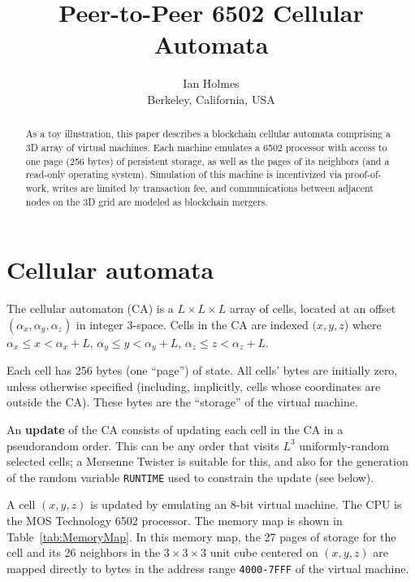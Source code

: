 \documentclass{article}
\newcommand\hex[1]{{\tt #1}}
\newcommand\hexrange[2]{\hex{#1}{\tt -}\hex{#2}}
\begin{document}
\title{Peer-to-Peer 6502 Cellular Automata}
\author{Ian Holmes \\ Berkeley, California, USA}

\maketitle


\begin{abstract}
  As a toy illustration,
  this paper describes a blockchain cellular automata
  comprising a 3D array of virtual machines.
  Each machine emulates a 6502 processor with access to one page (256 bytes) of persistent storage,
  as well as the pages of its neighbors (and a read-only operating system).
  Simulation of this machine is incentivized via proof-of-work,
  writes are limited by transaction fee,
  and communications between adjacent nodes on the 3D grid are modeled as blockchain mergers.
\end{abstract}

\section{Cellular automata}

The cellular automaton (CA) is a $L \times L \times L$ array of cells,
located at an offset $(\alpha_x,\alpha_y,\alpha_z)$ in integer 3-space.
Cells in the CA are indexed $(x,y,z$) where
$\alpha_x \leq x < \alpha_x+L$,
$\alpha_y \leq y < \alpha_y+L$,
$\alpha_z \leq z < \alpha_z+L$.

Each cell has 256 bytes (one ``page'') of state.
All cells' bytes are initially zero, unless otherwise specified
(including, implicitly, cells whose coordinates are outside the CA).
These bytes are the ``storage'' of the virtual machine.

An {\bf update} of the CA consists of updating each cell in the CA in a pseudorandom order.
This can be any order that visits $L^3$ uniformly-random selected cells;
a Mersenne Twister is suitable for this,
and also for the generation of the random variable {\tt RUNTIME} used to constrain the update (see below).

A cell $(x,y,z)$ is updated by emulating an 8-bit virtual machine.
The CPU is the MOS Technology 6502 processor.
The memory map is shown in Table~\ref{tab:MemoryMap}.
In this memory map, the 27 pages of storage
for the cell and its 26 neighbors
in the $3 \times 3 \times 3$ unit cube centered on $(x,y,z)$
are mapped directly to bytes in the address range \hexrange{4000}{7FFF} of the virtual machine.
\end{document}
